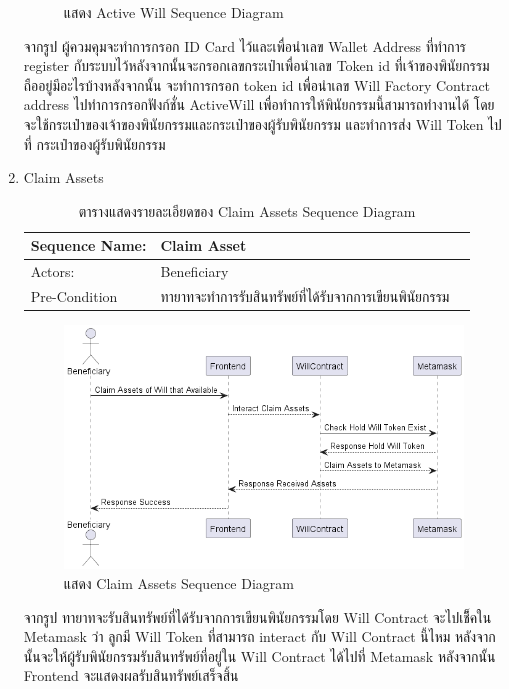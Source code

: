 \documentclass[12pt,oneside,openright,a4paper]{cpe-thai-project}
\begin{document}
\begin{enumerate}[label=\thesubsection.\arabic*,leftmargin=0pt,itemindent=1.25cm]
\begin{figure}[!thb]
			\caption{แสดง Active Will Sequence Diagram}
		\end{figure}
		\FloatBarrier
	\tab จากรูป ผู้ควมคุมจะทำการกรอก ID Card ไว้และเพื่อนำเลข Wallet Address ที่ทำการ register กับระบบไว้หลังจากนั้นจะกรอกเลขกระเป๋าเพื่อนำเลข Token id ที่เจ้าของพินัยกรรมถืออยู่มีอะไรบ้างหลังจากนั้น จะทำการกรอก token id เพื่อนำเลข Will Factory Contract address ไปทำการกรอกฟังก์ชั่น ActiveWill เพื่อทำการให้พินัยกรรมนี้สามารถทำงานได้ โดยจะใช้กระเป๋าของเจ้าของพินัยกรรมและกระเป๋าของผู้รับพินัยกรรม และทำการส่ง Will Token ไปที่ กระเป๋าของผู้รับพินัยกรรม
	\item Claim Assets
	\begin{table}[h]
\centering
\caption{ตารางแสดงรายละเอียดของ Claim Assets Sequence Diagram}
\begin{tabularx}{\textwidth}{|l|X|X|} 
\hline
Sequence Name: & Claim Asset                                             \\ 
\hline
Actors:        & Beneficiary                                            \\ 
\hline
Pre-Condition  & ทายาทจะทำการรับสินทรัพย์ที่ได้รับจากการเขียนพินัยกรรม  \\
\hline
\end{tabularx}
\end{table}
		\begin{figure}[!thb]
			\centering
			\includegraphics[scale=0.45]{claimAssetseq}
			\caption{แสดง Claim Assets Sequence Diagram}
		\end{figure}
		\FloatBarrier
	\tab จากรูป ทายาทจะรับสินทรัพย์ที่ได้รับจากการเขียนพินัยกรรมโดย Will Contract จะไปเช็ึคใน Metamask ว่า ลูกมี Will Token ที่สามารถ interact กับ Will Contract นี้ไหม หลังจากนั้นจะให้ผู้รับพินัยกรรมรับสินทรัพย์ที่อยู่ใน Will Contract ได้ไปที่ Metamask หลังจากนั้น Frontend จะแสดงผลรับสินทรัพย์เสร็จสิ้น
	\end{enumerate}
\clearpage
\end{document}
